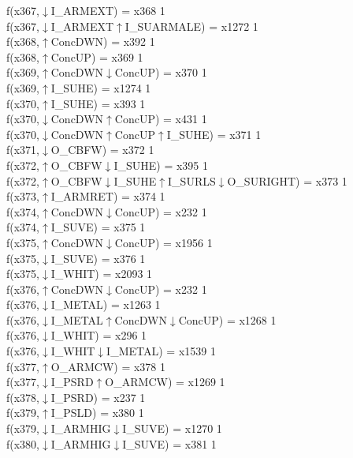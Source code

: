 f(x367,$\downarrow$I\_ARMEXT) = x368 {1} \\
f(x367,$\downarrow$I\_ARMEXT$\uparrow$I\_SUARMALE) = x1272 {1} \\
f(x368,$\uparrow$ConcDWN) = x392 {1} \\
f(x368,$\uparrow$ConcUP) = x369 {1} \\
f(x369,$\uparrow$ConcDWN$\downarrow$ConcUP) = x370 {1} \\
f(x369,$\uparrow$I\_SUHE) = x1274 {1} \\
f(x370,$\uparrow$I\_SUHE) = x393 {1} \\
f(x370,$\downarrow$ConcDWN$\uparrow$ConcUP) = x431 {1} \\
f(x370,$\downarrow$ConcDWN$\uparrow$ConcUP$\uparrow$I\_SUHE) = x371 {1} \\
f(x371,$\downarrow$O\_CBFW) = x372 {1} \\
f(x372,$\uparrow$O\_CBFW$\downarrow$I\_SUHE) = x395 {1} \\
f(x372,$\uparrow$O\_CBFW$\downarrow$I\_SUHE$\uparrow$I\_SURLS$\downarrow$O\_SURIGHT) = x373 {1} \\
f(x373,$\uparrow$I\_ARMRET) = x374 {1} \\
f(x374,$\uparrow$ConcDWN$\downarrow$ConcUP) = x232 {1} \\
f(x374,$\uparrow$I\_SUVE) = x375 {1} \\
f(x375,$\uparrow$ConcDWN$\downarrow$ConcUP) = x1956 {1} \\
f(x375,$\downarrow$I\_SUVE) = x376 {1} \\
f(x375,$\downarrow$I\_WHIT) = x2093 {1} \\
f(x376,$\uparrow$ConcDWN$\downarrow$ConcUP) = x232 {1} \\
f(x376,$\downarrow$I\_METAL) = x1263 {1} \\
f(x376,$\downarrow$I\_METAL$\uparrow$ConcDWN$\downarrow$ConcUP) = x1268 {1} \\
f(x376,$\downarrow$I\_WHIT) = x296 {1} \\
f(x376,$\downarrow$I\_WHIT$\downarrow$I\_METAL) = x1539 {1} \\
f(x377,$\uparrow$O\_ARMCW) = x378 {1} \\
f(x377,$\downarrow$I\_PSRD$\uparrow$O\_ARMCW) = x1269 {1} \\
f(x378,$\downarrow$I\_PSRD) = x237 {1} \\
f(x379,$\uparrow$I\_PSLD) = x380 {1} \\
f(x379,$\downarrow$I\_ARMHIG$\downarrow$I\_SUVE) = x1270 {1} \\
f(x380,$\downarrow$I\_ARMHIG$\downarrow$I\_SUVE) = x381 {1} \\
